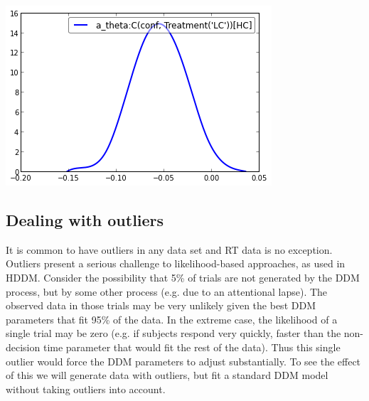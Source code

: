 \documentclass[letterpaper,10pt,english]{sphinxmanual}
\begin{document}
\includegraphics{hddm_demo_fig_09.png}


\subsection{Dealing with outliers}
\label{demo:dealing-with-outliers}
It is common to have outliers in any data set and RT data is no
exception. Outliers present a serious challenge to likelihood-based
approaches, as used in HDDM. Consider the possibility that 5\% of trials
are not generated by the DDM process, but by some other process (e.g.
due to an attentional lapse). The observed data in those trials may be
very unlikely given the best DDM parameters that fit 95\% of the data. In
the extreme case, the likelihood of a single trial may be zero (e.g. if
subjects respond very quickly, faster than the non-decision time 
parameter that would fit the rest of the data). Thus this single outlier
would force the DDM parameters to adjust substantially. To see the
effect of this we will generate data with outliers, but fit a standard
DDM model without taking outliers into account.
\end{document}
